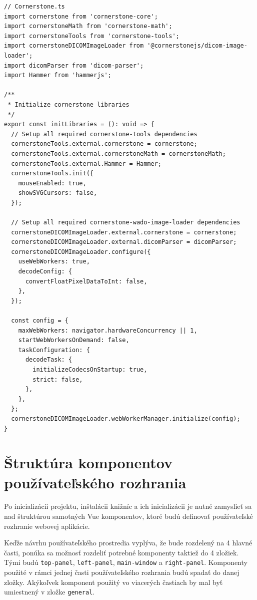 \begin{minipage}[]{\linewidth}
\begin{verbatim}
// Cornerstone.ts
import cornerstone from 'cornerstone-core';
import cornerstoneMath from 'cornerstone-math';
import cornerstoneTools from 'cornerstone-tools';
import cornerstoneDICOMImageLoader from '@cornerstonejs/dicom-image-loader';
import dicomParser from 'dicom-parser';
import Hammer from 'hammerjs';

/**
 * Initialize cornerstone libraries
 */
export const initLibraries = (): void => {
  // Setup all required cornerstone-tools dependencies
  cornerstoneTools.external.cornerstone = cornerstone;
  cornerstoneTools.external.cornerstoneMath = cornerstoneMath;
  cornerstoneTools.external.Hammer = Hammer;
  cornerstoneTools.init({
    mouseEnabled: true,
    showSVGCursors: false,
  });

  // Setup all required cornerstone-wado-image-loader dependencies
  cornerstoneDICOMImageLoader.external.cornerstone = cornerstone;
  cornerstoneDICOMImageLoader.external.dicomParser = dicomParser;
  cornerstoneDICOMImageLoader.configure({
    useWebWorkers: true,
    decodeConfig: {
      convertFloatPixelDataToInt: false,
    },
  });

  const config = {
    maxWebWorkers: navigator.hardwareConcurrency || 1,
    startWebWorkersOnDemand: false,
    taskConfiguration: {
      decodeTask: {
        initializeCodecsOnStartup: true,
        strict: false,
      },
    },
  };
  cornerstoneDICOMImageLoader.webWorkerManager.initialize(config);
}
\end{verbatim}
\end{minipage}

\section {Štruktúra komponentov používateľského rozhrania}
Po inicializácii projektu, inštalácii knižníc a ich inicializácii je nutné zamyslieť sa nad štruktúrou samotných Vue komponentov, ktoré budú definovať používateľské rozhranie webovej aplikácie.

Keďže návrhu používateľského prostredia vyplýva, že bude rozdelený na 4 hlavné časti, ponúka sa možnosť rozdeliť potrebné komponenty taktiež do 4 zložiek. Tými budú \texttt{top-panel}, \texttt{left-panel}, \texttt{main-window} a \texttt{right-panel}. Komponenty použité v rámci jednej časti používateľského rozhrania budú spadať do danej zložky. Akýkoľvek komponent použitý vo viacerých častiach by mal byť umiestnený v zložke \texttt{general}.

